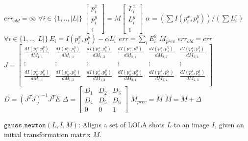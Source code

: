 \begin{algorithm}
	\begin{algorithmic}
		\STATE $err_{old} = \infty$
		\LOOP
		\STATE $\forall i \in \{1,..,|L|\}~\left[\begin{array}{c}p_i^x\\p_i^y\\1\end{array}\right] =
				M \left[\begin{array}{c}L_i^x\\L_i^y\\1\end{array}\right]$
		\STATE $\alpha = \left(\sum I(p_i^x, p_i^y)\right) / \left(\sum L_i^r\right)$
		\STATE $\forall i \in \{1,..,|L|\}~E_i = I(p_i^x, p_i^y) - \alpha L_i^r$
		\STATE $err = \sum_i E_i^2$
			\RETURN $M_{prev}$
		\ENDIF
		\STATE $err_{old} = err$
		\STATE $J = \left[\begin{array}{cccccc}
			\frac{dI(p_1^x, p_1^y)}{dM_{1,1}}&\frac{dI(p_1^x, p_1^y)}{dM_{1,2}}&\frac{dI(p_1^x, p_1^y)}{dM_{1,3}}&\frac{dI(p_1^x, p_1^y)}{dM_{2,1}}&\frac{dI(p_1^x, p_1^y)}{dM_{2,2}}&\frac{dI(p_1^x, p_1^y)}{dM_{2,3}}\\
			\vdots&\vdots&\vdots&\vdots&\vdots&\vdots\\
			\frac{dI(p_n^x, p_n^y)}{dM_{1,1}}&\frac{dI(p_n^x, p_n^y)}{dM_{1,2}}&\frac{dI(p_n^x, p_n^y)}{dM_{1,3}}&\frac{dI(p_n^x, p_n^y)}{dM_{2,1}}&\frac{dI(p_n^x, p_n^y)}{dM_{2,2}}&\frac{dI(p_n^x, p_n^y)}{dM_{2,3}}\\
			\end{array}\right]$
		\STATE $D = \left(J^T J\right)^{-1} J^T E$
		\STATE $\Delta = \left[\begin{array}{ccc}
				D_1&D_2&D_3\\D_4&D_5&D_6\\0&0&1
			\end{array}\right]$
		\STATE $M_{prev} = M$
		\STATE $M = M + \Delta$
		\ENDLOOP
	\end{algorithmic}
	\caption{$\texttt{gauss\_newton}(L, I, M)$: Aligns a set of LOLA shots $L$ to an image $I$,
		given an initial transformation matrix $M$.}
	\label{alg:gaussnewton}
\end{algorithm}



